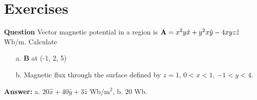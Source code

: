 \documentclass[12pt,a4paper]{article}
\begin{document}
\section{Exercises}
\noindent\textbf{Question} Vector magnetic potential in a region is $\mathrm{\textbf A}=x^2y\hat x+y^2x\hat y-4xyz\hat z$ Wb/m. Calculate
\begin{itemize}
\item[a.] \textbf{B} at (-1, 2, 5)
\item[b.] Magnetic flux through the surface defined by $z=1$, $0<x<1$, $-1<y<4$.
\end{itemize}
\noindent\textbf{Answer: } a. $20\hat x+40\hat y+3\hat z$ Wb/m$^2$, b. 20 Wb.


\end{document}
